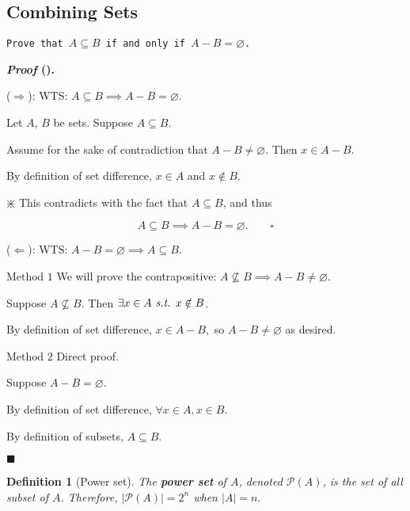 \documentclass[12pt,a4paper]{article}
\newtheorem{df}{Definition}[subsection]
\newcounter{nprf}[subsection]
\newenvironment*{prf}{\par\indent\textbf{\textit{Proof} (\stepcounter{nprf}\thenprf). }\par }{\par\hfill $\blacksquare$\par}
\def\pow{{\mathcal{P}}}
\def\emptyset{\varnothing}
\def\st{\emph{ s.t. }}
\begin{document}
\subsection{Combining Sets}
\begin{framed}
\noindent\texttt{Prove that $A\subseteq B$ if and only if $A-B=\emptyset$.}
\begin{prf}
	($\Rightarrow$): WTS: $A\subseteq B\implies A-B=\emptyset$.\par\hspace{5mm}Let $A$, $B$ be sets. Suppose $A\subseteq B.$\par\hspace{5mm}Assume for the sake of contradiction that $A-B\neq\emptyset$. Then $x\in A-B$.\par\hspace{5mm}By definition of set difference, $x\in A$ and $x\notin B$.\par\begin{center}$\divideontimes$ This contradicts with the fact that $A\subseteq B$, and thus \end{center}\[A\subseteq B\implies A-B=\emptyset.\qquad\square\]\par
	($\Leftarrow$): WTS: $A-B=\emptyset\implies A\subseteq B.$\par\hspace{5mm}$\boxed{\text{Method }1}$ We will prove the contrapositive: $A\nsubseteq B\implies A-B\neq\emptyset$.\par\hspace{5mm}Suppose $A\nsubseteq B$. Then $\exists x\in A \st x\notin B$.\par\hspace{5mm}By definition of set difference, $x\in A-B,$ so $A-B\neq\emptyset$ as desired.\par\hspace{5mm}$\boxed{\text{Method }2}$ Direct proof.\par\hspace{5mm}Suppose $A-B=\emptyset$.\par\hspace{5mm}By definition of set difference, $\forall x\in A, x\in B.$\par\hspace{5mm}By definition of subsets, $A\subseteq B.$
\end{prf}	
\end{framed}
\begin{df}[Power set]
	The \textbf{power set} of $A$, denoted $\pow(A)$, is the set of all subset of $A$. Therefore, $|\pow(A)|=2^n$ when $|A|=n.$
\end{df}
\end{document}
